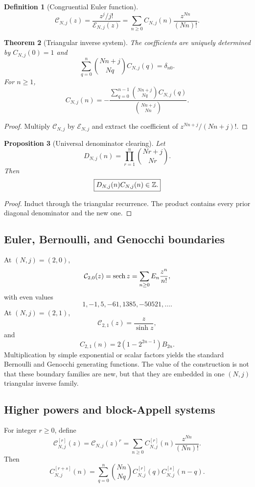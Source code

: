 \documentclass[11pt]{article}
\newtheorem{theorem}{Theorem}[section]\newtheorem{proposition}[theorem]{Proposition}\newtheorem{lemma}[theorem]{Lemma}\newtheorem{corollary}[theorem]{Corollary}
\theoremstyle{definition}\newtheorem{definition}[theorem]{Definition}\newtheorem{example}[theorem]{Example}\newtheorem{construction}[theorem]{Construction}\newtheorem{algorithm}[theorem]{Algorithm}\newtheorem{conjecture}[theorem]{Conjecture}\newtheorem{problem}[theorem]{Problem}
\theoremstyle{remark}\newtheorem{remark}[theorem]{Remark}\newtheorem{boundary}[theorem]{Boundary}\newtheorem{certificate}[theorem]{Computational Certificate}\newtheorem{classical}[theorem]{Classical Input}\newtheorem{principle}[theorem]{Structural Principle}
\begin{document}
\begin{definition}[Congruential Euler function]
\[
 \boxed{\mathcal C_{N,j}(z)=\frac{z^j/j!}{\mathcal E_{N,j}(z)}
 =\sum_{n\geq0}C_{N,j}(n)\frac{z^{Nn}}{(Nn)!}.}
\]
\end{definition}

\begin{theorem}[Triangular inverse system]
The coefficients are uniquely determined by $C_{N,j}(0)=1$ and
\[
 \boxed{\sum_{q=0}^{n}\binom{Nn+j}{Nq}C_{N,j}(q)=\delta_{n0}.}
\]
For $n\geq1$,
\[
 \boxed{C_{N,j}(n)=
 -\frac{\sum_{q=0}^{n-1}\binom{Nn+j}{Nq}C_{N,j}(q)}{\binom{Nn+j}{Nn}}.}
\]
\end{theorem}
\begin{proof}
Multiply $\mathcal C_{N,j}$ by $\mathcal E_{N,j}$ and extract the coefficient of $z^{Nn+j}/(Nn+j)!$.
\end{proof}

\begin{proposition}[Universal denominator clearing]
Let
\[
 D_{N,j}(n)=\prod_{r=1}^{n}\binom{Nr+j}{Nr}.
\]
Then
\[
 \boxed{D_{N,j}(n)C_{N,j}(n)\in\mathbb Z.}
\]
\end{proposition}
\begin{proof}
Induct through the triangular recurrence.  The product contains every prior diagonal denominator and the new one.
\end{proof}

\subsection{Euler, Bernoulli, and Genocchi boundaries}
At $(N,j)=(2,0)$,
\[
 \mathcal C_{2,0}(z)=\operatorname{sech} z
 =\sum_{n\geq0}E_n\frac{z^n}{n!},
\]
with even values
\[
 1,-1,5,-61,1385,-50521,\ldots.
\]
At $(N,j)=(2,1)$,
\[
 \mathcal C_{2,1}(z)=\frac{z}{\sinh z},
\]
and
\[
 \boxed{C_{2,1}(n)=2(1-2^{2n-1})B_{2n}.}
\]
Multiplication by simple exponential or scalar factors yields the standard Bernoulli and Genocchi generating functions.  The value of the construction is not that these boundary families are new, but that they are embedded in one $(N,j)$ triangular inverse family.

\subsection{Higher powers and block-Appell systems}
For integer $r\geq0$, define
\[
 \mathcal C_{N,j}^{[r]}(z)=\mathcal C_{N,j}(z)^r
 =\sum_{n\geq0}C_{N,j}^{[r]}(n)\frac{z^{Nn}}{(Nn)!}.
\]
Then
\[
 \boxed{C_{N,j}^{[r+s]}(n)=\sum_{q=0}^{n}\binom{Nn}{Nq}C_{N,j}^{[r]}(q)C_{N,j}^{[s]}(n-q).}
\]
\end{document}
